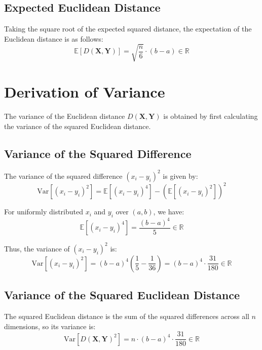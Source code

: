 \documentclass{article}
\begin{document}
\subsection{Expected Euclidean Distance}
Taking the square root of the expected squared distance, the expectation of the Euclidean distance is as follows:
\begin{equation}
    \mathbb{E}[D(\mathbf{X}, \mathbf{Y})] = \sqrt{\frac{n}{6}} \cdot (b - a) \in \mathbb{R}
\end{equation}

\pagebreak

\section{Derivation of Variance}
The variance of the Euclidean distance $D(\mathbf{X}, \mathbf{Y})$ is obtained by first calculating the variance of the squared Euclidean distance.

\subsection{Variance of the Squared Difference}
The variance of the squared difference $(x_i - y_i)^2$ is given by:
\begin{equation}
    \text{Var}[(x_i - y_i)^2] = \mathbb{E}[(x_i - y_i)^4] - \left(\mathbb{E}[(x_i - y_i)^2]\right)^2
\end{equation}

For uniformly distributed $x_i$ and $y_i$ over $(a, b)$, we have:
\begin{equation}
    \mathbb{E}[(x_i - y_i)^4] = \frac{(b - a)^4}{5} \in \mathbb{R}
\end{equation}

Thus, the variance of $(x_i - y_i)^2$ is:
\begin{equation}
    \text{Var}[(x_i - y_i)^2] = (b - a)^4 \left(\frac{1}{5} - \frac{1}{36}\right) = (b - a)^4 \cdot \frac{31}{180} \in \mathbb{R}
\end{equation}

\subsection{Variance of the Squared Euclidean Distance}
The squared Euclidean distance is the sum of the squared differences across all $n$ dimensions, so its variance is:
\begin{equation}
    \text{Var}[D(\mathbf{X}, \mathbf{Y})^2] = n \cdot (b - a)^4 \cdot \frac{31}{180} \in \mathbb{R}
\end{equation}
\end{document}
